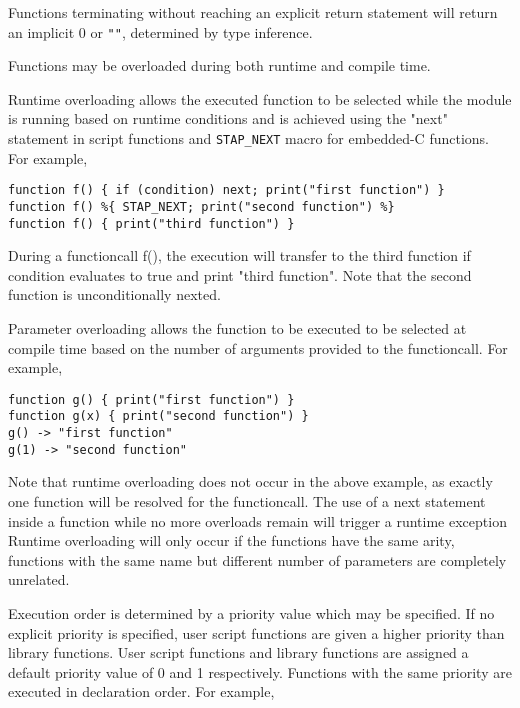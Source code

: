 \documentclass[twoside,english]{article}
\newenvironment{vindent}
{\begin{list}{}{\setlength{\listparindent}{6pt}}
\item[]}
{\end{list}}
\begin{document}
Functions terminating without reaching an explicit return statement will
return an implicit 0 or \verb+""+, determined by type inference.

Functions may be overloaded during both runtime and compile time.

Runtime overloading allows the executed function to be selected while the
module is running based on runtime conditions and is achieved using the
"next" statement in script functions and \texttt{STAP\_NEXT} macro for embedded-C
functions. For example,

\begin{vindent}
\begin{verbatim}
function f() { if (condition) next; print("first function") }
function f() %{ STAP_NEXT; print("second function") %}
function f() { print("third function") }
\end{verbatim}
\end{vindent}

During a functioncall f(), the execution will transfer to the third function
if condition evaluates to true and print "third function". Note that the second
function is unconditionally nexted.

Parameter overloading allows the function to be executed to be selected
at compile time based on the number of arguments provided to the
functioncall. For example,

\begin{vindent}
\begin{verbatim}
function g() { print("first function") }
function g(x) { print("second function") }
g() -> "first function"
g(1) -> "second function"
\end{verbatim}
\end{vindent}

Note that runtime overloading does not occur in the above example, as exactly
one function will be resolved for the functioncall. The use of a next statement
inside a function while no more overloads remain will trigger a runtime exception
Runtime overloading will only occur if the functions have the same arity,
functions with the same name but different number of parameters are completely
unrelated.

Execution order is determined by a priority value which may be specified.
If no explicit priority is specified, user script functions are given a
higher priority than library functions. User script functions and library
functions are assigned a default priority value of 0 and 1 respectively.
Functions with the same priority are executed in declaration order. For example,
\end{document}
